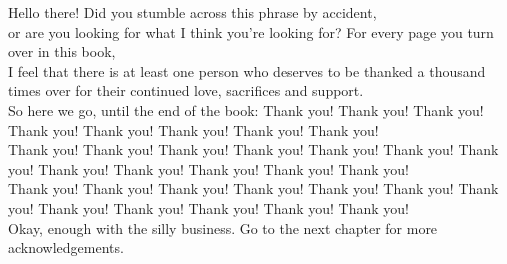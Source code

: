 























Hello there! Did you stumble across this phrase by accident,\\or are you looking for what I think you're looking for?
For every page you turn over in this book,\\I feel that there is at least one person who deserves to be thanked 
a thousand times over for their continued love, sacrifices and support.\\So here we go, until the end of the book: Thank you! Thank you!
Thank you! Thank you! Thank you! Thank you! Thank you! Thank you!\\Thank you! Thank you! Thank you! Thank you! Thank you! Thank you!
Thank you! Thank you! Thank you! Thank you! Thank you! Thank you!\\Thank you! Thank you! Thank you! Thank you! Thank you! Thank you!
Thank you! Thank you! Thank you! Thank you! Thank you! Thank you!\\Okay, enough with the silly business. 
Go to the next chapter for more acknowledgements.


















